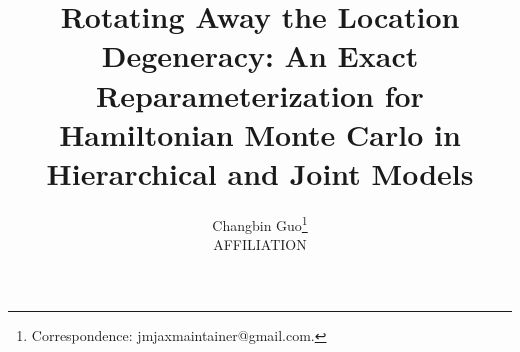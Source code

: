 \documentclass[11pt]{article}
\title{\bf Rotating Away the Location Degeneracy: An Exact
Reparameterization for Hamiltonian Monte Carlo in Hierarchical and Joint
Models}
\author{Changbin Guo\thanks{Correspondence: jmjaxmaintainer@gmail.com.}\\
AFFILIATION}
\date{}
\theoremstyle{definition}
\begin{document}
\maketitle

\bigskip














\appendix


\end{document}
